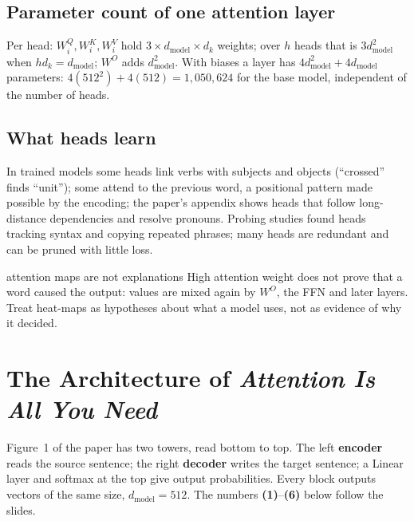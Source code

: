 \documentclass[11pt]{article}
\newcommand{\blk}[1]{\textbf{(#1)}}
\begin{document}
\subsection{Parameter count of one attention layer}
Per head: $W_i^Q,W_i^K,W_i^V$ hold $3\times d_{\text{model}}\times d_k$ weights; over $h$ heads that is $3d_{\text{model}}^2$ when $hd_k=d_{\text{model}}$; $W^O$ adds $d_{\text{model}}^2$. With biases a layer has $4d_{\text{model}}^2+4d_{\text{model}}$ parameters: $4(512^2)+4(512)=1{,}050{,}624$ for the base model, independent of the number of heads.

\subsection{What heads learn}
In trained models some heads link verbs with subjects and objects (``crossed'' finds ``unit''); some attend to the previous word, a positional pattern made possible by the encoding; the paper's appendix shows heads that follow long-distance dependencies and resolve pronouns. Probing studies found heads tracking syntax and copying repeated phrases; many heads are redundant and can be pruned with little loss.
\begin{pitfall}{attention maps are not explanations}
High attention weight does not prove that a word caused the output: values are mixed again by $W^O$, the FFN and later layers. Treat heat-maps as hypotheses about what a model uses, not as evidence of why it decided.
\end{pitfall}

\section{The Architecture of \emph{Attention Is All You Need}}\label{sec:arch}
Figure~1 of the paper has two towers, read bottom to top. The left \textbf{encoder} reads the source sentence; the right \textbf{decoder} writes the target sentence; a Linear layer and softmax at the top give output probabilities. Every block outputs vectors of the same size, $d_{\text{model}}=512$. The numbers \blk{1}--\blk{6} below follow the slides.
\end{document}
